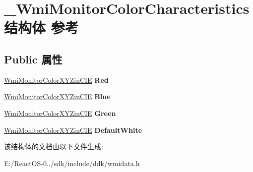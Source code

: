 \hypertarget{struct___wmi_monitor_color_characteristics}{}\section{\+\_\+\+Wmi\+Monitor\+Color\+Characteristics结构体 参考}
\label{struct___wmi_monitor_color_characteristics}
\subsection*{Public 属性}
\begin{DoxyCompactItemize}
\item 
\mbox{\label{struct___wmi_monitor_color_characteristics_ac72f1e1440a552ae13b31c26c0e2df01}} 
\hyperlink{struct___wmi_monitor_color_x_y_zin_c_i_e}{Wmi\+Monitor\+Color\+X\+Y\+Zin\+C\+IE} {\bfseries Red}
\item 
\mbox{\label{struct___wmi_monitor_color_characteristics_ae6982a21b69da8079d6b632f2ec2705f}} 
\hyperlink{struct___wmi_monitor_color_x_y_zin_c_i_e}{Wmi\+Monitor\+Color\+X\+Y\+Zin\+C\+IE} {\bfseries Blue}
\item 
\mbox{\label{struct___wmi_monitor_color_characteristics_a3eb5ea34ee9444ac45243b877a500915}} 
\hyperlink{struct___wmi_monitor_color_x_y_zin_c_i_e}{Wmi\+Monitor\+Color\+X\+Y\+Zin\+C\+IE} {\bfseries Green}
\item 
\mbox{\label{struct___wmi_monitor_color_characteristics_aa1a2b2ac0898d4a7c38c5b86057fc60d}} 
\hyperlink{struct___wmi_monitor_color_x_y_zin_c_i_e}{Wmi\+Monitor\+Color\+X\+Y\+Zin\+C\+IE} {\bfseries Default\+White}
\end{DoxyCompactItemize}


该结构体的文档由以下文件生成\+:\begin{DoxyCompactItemize}
\item 
E\+:/\+React\+O\+S-\/0../sdk/include/ddk/wmidata.\+h\end{DoxyCompactItemize}
